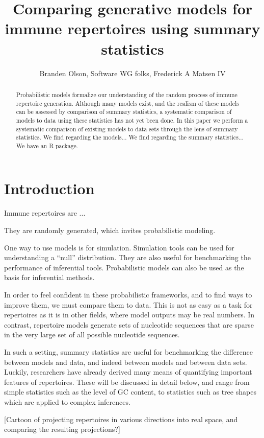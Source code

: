 \documentclass{article}
\title{Comparing generative models for immune repertoires using summary statistics}
\author{Branden Olson, Software WG folks, Frederick A Matsen IV}
\begin{document}
\maketitle

\begin{abstract}
Probabilistic models formalize our understanding of the random process of immune repertoire generation.
Although many models exist, and the realism of these models can be assessed by comparison of summary statistics, a systematic comparison of models to data using these statistics has not yet been done.
In this paper we perform a systematic comparison of existing models to data sets through the lens of summary statistics.
We find regarding the models...
We find regarding the summary statistics...
We have an R package.
\end{abstract}

\section*{Introduction}

Immune repertoires are ...

They are randomly generated, which invites probabilistic modeling.

One way to use models is for simulation.
Simulation tools can be used for understanding a ``null'' distribution.
They are also useful for benchmarking the performance of inferential tools.
Probabilistic models can also be used as the basis for inferential methods.

In order to feel confident in these probabilistic frameworks, and to find ways to improve them, we must compare them to data.
This is not as easy as a task for repertoires as it is in other fields, where model outputs may be real numbers.
In contrast, repertoire models generate sets of nucleotide sequences that are sparse in the very large set of all possible nucleotide sequences.

In such a setting, summary statistics are useful for benchmarking the difference between models and data, and indeed between models and between data sets.
Luckily, researchers have already derived many means of quantifying important features of repertoires.
These will be discussed in detail below, and range from simple statistics such as the level of GC content, to statistics such as tree shapes which are applied to complex inferences.

[Cartoon of projecting repertoires in various directions into real space, and comparing the resulting projections?]
\end{document}
